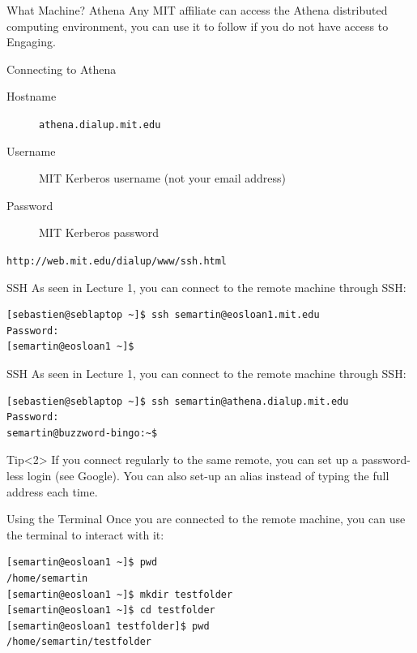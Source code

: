 \documentclass{beamer}
\begin{document}
\begin{frame}{What Machine? Athena}
  Any MIT affiliate can access the Athena distributed computing environment, you can use it to follow if you do not have access to Engaging.
  \vspace{1cm}
  \begin{block}{Connecting to Athena}
    \begin{description}
      \item[Hostname] \texttt{athena.dialup.mit.edu}
      \item[Username] MIT Kerberos username (not your email address)
      \item[Password] MIT Kerberos password
    \end{description}
    \texttt{http://web.mit.edu/dialup/www/ssh.html}
  \end{block}
\end{frame}

\begin{frame}[fragile]{SSH}
  As seen in Lecture 1, you can connect to the remote machine through SSH:
  \begin{verbatim}
[sebastien@seblaptop ~]$ ssh semartin@eosloan1.mit.edu
Password:
[semartin@eosloan1 ~]$
  \end{verbatim}
\end{frame}

\begin{frame}[fragile]{SSH}
  As seen in Lecture 1, you can connect to the remote machine through SSH:
  \begin{verbatim}
[sebastien@seblaptop ~]$ ssh semartin@athena.dialup.mit.edu
Password:
semartin@buzzword-bingo:~$
  \end{verbatim}
 \begin{block}{Tip}<2>
    If you connect regularly to the same remote, you can set up a \alert{password-less login} (see Google). You can also set-up an alias instead of typing the full address each time.
  \end{block}
\end{frame}

\begin{frame}[fragile]{Using the Terminal}
    Once you are connected to the remote machine, you can use the terminal to interact with it:
    \begin{verbatim}
[semartin@eosloan1 ~]$ pwd
/home/semartin
[semartin@eosloan1 ~]$ mkdir testfolder
[semartin@eosloan1 ~]$ cd testfolder
[semartin@eosloan1 testfolder]$ pwd
/home/semartin/testfolder
    \end{verbatim}
\end{frame}
\end{document}
